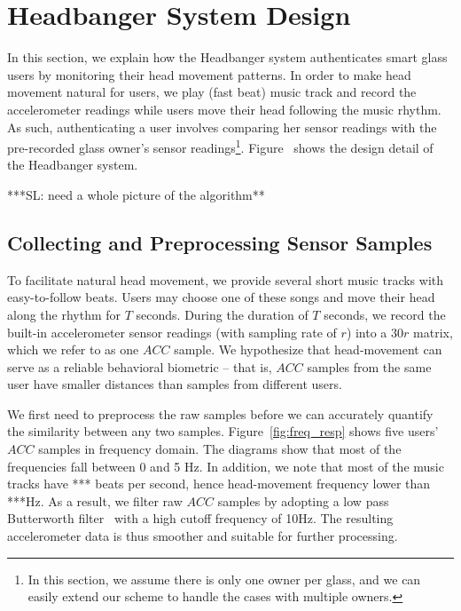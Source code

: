 \section{Headbanger System Design}\label{sec:design}

In this section, we explain how the Headbanger system authenticates smart glass users by monitoring their head movement patterns. In order to make head movement natural for users, we play (fast beat) music track and record the accelerometer readings while users move their head following the music rhythm. As such, authenticating a user involves comparing her sensor readings with the pre-recorded glass owner's sensor readings\footnote{In this section, we assume there is only one owner per glass, and we can easily extend our scheme to handle the cases with multiple owners.}. Figure~\cite{***} shows the design detail of the Headbanger system.


***SL: need a whole picture of the algorithm**


\subsection{Collecting and Preprocessing Sensor Samples}

To facilitate natural head movement, we provide several short music tracks with easy-to-follow beats. Users may choose one of these songs and move their head along the rhythm for $T$ seconds. During the duration of $T$ seconds, we record the built-in accelerometer sensor readings (with sampling rate of $r$) into a $30r $ matrix, which we refer to as one $ACC$ sample. We hypothesize that head-movement can serve as a reliable behavioral biometric -- that is, $ACC$ samples from the same user have smaller distances than samples from different users.


We first need to preprocess the raw samples before we can accurately quantify the similarity between any two samples. Figure~\ref{fig:freq_resp} shows five users' $ACC$ samples in frequency domain. The diagrams show that most of the frequencies fall between 0 and 5 Hz. In addition, we note that most of the music tracks have *** beats per second, hence head-movement frequency lower than ***Hz. As a result, we filter raw $ACC$ samples by adopting a low pass Butterworth filter~\cite{***} with a high cutoff frequency of 10Hz. The resulting accelerometer data is thus smoother and suitable for further processing.



